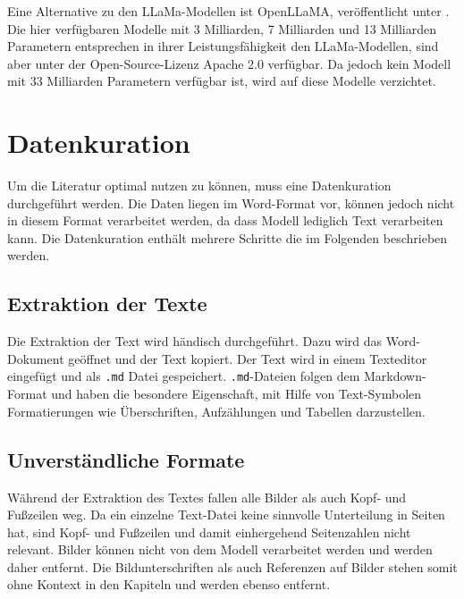 Eine Alternative zu den LLaMa-Modellen ist OpenLLaMA, veröffentlicht unter \citet{openllama}.
Die hier verfügbaren Modelle mit 3 Milliarden, 7 Milliarden und 13 Milliarden Parametern entsprechen in ihrer Leistungsfähigkeit den LLaMa-Modellen, sind aber unter der Open-Source-Lizenz Apache 2.0 verfügbar.
Da jedoch kein Modell mit 33 Milliarden Parametern verfügbar ist, wird auf diese Modelle verzichtet.\\

\section{Datenkuration}
Um die Literatur optimal nutzen zu können, muss eine Datenkuration durchgeführt werden.
Die Daten liegen im Word-Format vor, können jedoch nicht in diesem Format verarbeitet werden, da dass Modell lediglich Text verarbeiten kann.
Die Datenkuration enthält mehrere Schritte die im Folgenden beschrieben werden.\\

\subsection{Extraktion der Texte}
Die Extraktion der Text wird händisch durchgeführt.
Dazu wird das Word-Dokument geöffnet und der Text kopiert.
Der Text wird in einem Texteditor eingefügt und als \texttt{.md} Datei gespeichert.
\texttt{.md}-Dateien folgen dem Markdown-Format und haben die besondere Eigenschaft, mit Hilfe von Text-Symbolen Formatierungen wie Überschriften, Aufzählungen und Tabellen darzustellen.

\subsection{Unverständliche Formate}
Während der Extraktion des Textes fallen alle Bilder als auch Kopf- und Fußzeilen weg.
Da ein einzelne Text-Datei keine sinnvolle Unterteilung in Seiten hat, sind Kopf- und Fußzeilen und damit einhergehend Seitenzahlen nicht relevant.
Bilder können nicht von dem Modell verarbeitet werden und werden daher entfernt.
Die Bildunterschriften als auch Referenzen auf Bilder stehen somit ohne Kontext in den Kapiteln und werden ebenso entfernt.

